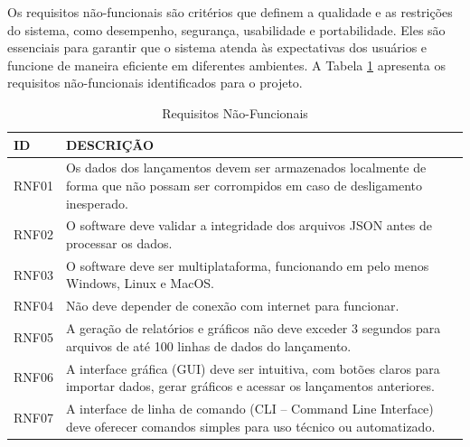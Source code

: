 \begin{samepage}
Os requisitos não-funcionais são critérios que definem a qualidade e as restrições do sistema, como desempenho, segurança, usabilidade e portabilidade. Eles são essenciais para garantir que o sistema atenda às expectativas dos usuários e funcione de maneira eficiente em diferentes ambientes. A Tabela \ref{tab:requisitos_nao_funcionais} apresenta os requisitos não-funcionais identificados para o projeto.

\begin{table}[H]
\centering
\scriptsize
\setlength{\tabcolsep}{4pt}
\caption{Requisitos Não-Funcionais}
\begin{tabular}{|l|p{11cm}|}
\hline
\textbf{ID} & \textbf{DESCRIÇÃO} \\
\hline
RNF01 & Os dados dos lançamentos devem ser armazenados localmente de forma que não possam ser corrompidos em caso de desligamento inesperado. \\
\hline
RNF02 & O software deve validar a integridade dos arquivos JSON antes de processar os dados. \\
\hline
RNF03 & O software deve ser multiplataforma, funcionando em pelo menos Windows, Linux e MacOS. \\
\hline
RNF04 & Não deve depender de conexão com internet para funcionar. \\
\hline
RNF05 & A geração de relatórios e gráficos não deve exceder 3 segundos para arquivos de até 100 linhas de dados do lançamento. \\
\hline
RNF06 & A interface gráfica (GUI) deve ser intuitiva, com botões claros para importar dados, gerar gráficos e acessar os lançamentos anteriores. \\
\hline
RNF07 & A interface de linha de comando (CLI – Command Line Interface) deve oferecer comandos simples para uso técnico ou automatizado. \\
\hline
\end{tabular}
\label{tab:requisitos_nao_funcionais}
\end{table}
\end{samepage}


